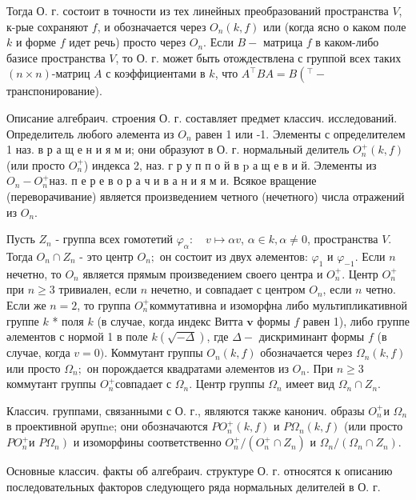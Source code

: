 \documentclass[10pt]{article}
\begin{document}
Тогда О. г. состоит в точности из тех линейных преобразований пространства $V$, к-рые сохраняют $f$, и обозначается через $O_{n}(k, f)$ или (когда ясно о каком поле $k$ и форме $f$ идет речь) просто через $O_{n}$. Если $B-$ матрица $f$ в каком-либо базисе пространства $V$, то О. г. может быть отождествлена с группой всех таких $(n \times n)$-матриц $A$ с коэффициентами в $k$, что $A^{\top} B A=B\left({ }^{\top}-\right.$ транспонирование).

Описание алгебраич. строения О. г. составляет предмет классич. исследований. Определитель любого әлемента из $O_{n}$ равен 1 или -1. Элементы с определителем 1 наз. в р а щ е н и я м и; они образуют в О. г. нормальный делитель $O_{n}^{+}(k, f)$ (или просто $O_{n}^{+}$) индекса 2, наз. г р у п п о й в $\mathrm{p}$ а щ е в и й. Элементы из $O_{n}-O_{n}^{+}$наз. п е р е в о р а ч и в а н и я м и. Всякое вращение (переворачивание) является произведением четного (нечетного) числа отражений из $O_{n}$.

Пусть $Z_{n}$ - группа всех гомотетий $\varphi_{\alpha}: \quad v \mapsto \alpha v$, $\alpha \in k, \alpha \neq 0$, пространства $V$. Тогда $O_{n} \cap Z_{n}$ - это центр $O_{n} ;$ он состоит из двух әлементов: $\varphi_{1}$ и $\varphi_{-1}$. Если $n$ нечетно, то $O_{n}$ является прямым произведением своего центра и $O_{n}^{+}$. Центр $O_{n}^{+}$при $n \geqslant 3$ тривиален, если $n$ нечетно, и совпадает с центром $O_{n}$, если $n$ четно. Если же $n=2$, то группа $O_{n}^{+}$коммутативна и изоморфна либо мультипликативной группе $k$ * поля $k$ (в случае, когда индекс Витта $\boldsymbol{v}$ формы $f$ равен 1), либо группе әлементов с нормой 1 в поле $k(\sqrt{-\Delta})$, где $\Delta-$ дискриминант формы $f$ (в случае, когда $v=0)$. Коммутант группы $O_{n}(k, f)$ обозначается через $\Omega_{n}(k, f)$ или просто $\Omega_{n} ;$ он порождается квадратами әлементов из $O_{n}$. При $n \geqslant 3$ коммутант группы $O_{n}^{+}$совпадает с $\Omega_{n}$. Центр группы $\Omega_{n}$ имеет вид $\Omega_{n} \cap Z_{n}$.

Классич. группами, связанными с О. г., являются также канонич. образы $O_{n}^{+}$и $\Omega_{n}$ в проективной әрупne; они обозначаются $P O_{n}^{+}(k, f)$ и $P \Omega_{n}(k, f)$ (или просто $P O_{n}^{+}$и $\left.P \Omega_{n}\right)$ и изоморфины соответственно $O_{n}^{+} /\left(O_{n}^{+} \cap Z_{n}\right)$ и $\Omega_{n} /\left(\Omega_{n} \cap Z_{n}\right)$.

Основные классич. факты об алгебраич. структуре О. г. относятся к описанию последовательных факторов следующего ряда нормальных делителей в О. г.
\end{document}
